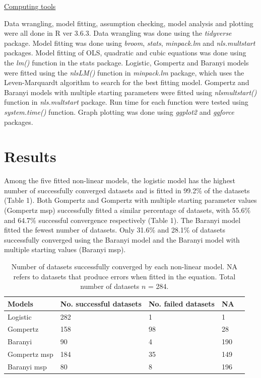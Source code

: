 \documentclass[11pt]{article}
\begin{document}
\underline{Computing tools}

Data wrangling, model fitting, assumption checking, model analysis and plotting were all done in R ver 3.6.3. Data wrangling was done using the \emph{tidyverse} package. Model fitting was done using \emph{broom}, \emph{stats}, \emph{minpack.lm} and \emph{nls.multstart} packages. Model fitting of OLS, quadratic and cubic equations was done using the \emph{lm()} function in the stats package. Logistic, Gompertz and Baranyi models were fitted using the \emph{nlsLM()} function in \emph{minpack.lm} package, which uses the Leven-Marquardt algorithm to search for the best fitting model. Gompertz and Baranyi models with multiple starting parameters were fitted using \emph{nls\textunderscore multstart()} function in \emph{nls.multstart} package. Run time for each function were tested using \emph{system.time()} function. Graph plotting was done using \emph{ggplot2} and \emph{ggforce} packages. 
\vspace{\baselineskip}



\section{Results}

Among the five fitted non-linear models, the logistic model has the highest number of successfully converged datasets and is fitted in 99.2\% of the datasets (Table 1). Both Gompertz and Gompertz with multiple starting parameter values (Gompertz msp) successfully fitted a similar percentage of datasets, with 55.6\% and 64.7\% successful convergence respectively (Table 1). The Baranyi model fitted the fewest number of datasets. Only 31.6\% and 28.1\% of datasets successfully converged using the Baranyi model and the Baranyi model with multiple starting values (Baranyi msp).
\vspace{\baselineskip}

\begin{table}[]
\caption{Number of datasets successfully converged by each non-linear model. NA refers to datasets that produce errors when fitted in the equation. Total number of datasets \(n\) = 284.}
\begin{tabular}{@{}lllll@{}}
\toprule
Models       & No. successful datasets & No. failed datasets & NA  &  \\ \midrule
Logistic     & 282                     & 1                   & 1   &  \\
Gompertz     & 158                     & 98                  & 28  &  \\
Baranyi      & 90                      & 4                   & 190 &  \\
Gompertz msp & 184                     & 35                  & 149 &  \\
Baranyi msp  & 80                      & 8                   & 196 &  \\ \bottomrule
\end{tabular}
\end{table}
\end{document}
